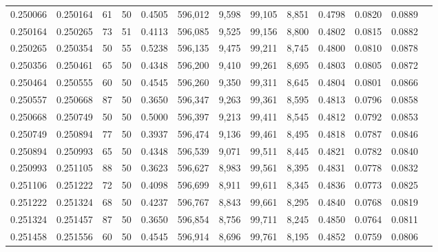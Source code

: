 \begin{tabular}{rrrrrrrrrrrrr}
0.250066 & 0.250164 &    61 &  50 &                                     0.4505 & 596,012 &   9,598 &  99,105 &   8,851 & 0.4798 & 0.0820 & 0.0889 \\
0.250164 & 0.250265 &    73 &  51 &                                     0.4113 & 596,085 &   9,525 &  99,156 &   8,800 & 0.4802 & 0.0815 & 0.0882 \\
0.250265 & 0.250354 &    50 &  55 &                                     0.5238 & 596,135 &   9,475 &  99,211 &   8,745 & 0.4800 & 0.0810 & 0.0878 \\
0.250356 & 0.250461 &    65 &  50 &                                     0.4348 & 596,200 &   9,410 &  99,261 &   8,695 & 0.4803 & 0.0805 & 0.0872 \\
0.250464 & 0.250555 &    60 &  50 &                                     0.4545 & 596,260 &   9,350 &  99,311 &   8,645 & 0.4804 & 0.0801 & 0.0866 \\
0.250557 & 0.250668 &    87 &  50 &                                     0.3650 & 596,347 &   9,263 &  99,361 &   8,595 & 0.4813 & 0.0796 & 0.0858 \\
0.250668 & 0.250749 &    50 &  50 &                                     0.5000 & 596,397 &   9,213 &  99,411 &   8,545 & 0.4812 & 0.0792 & 0.0853 \\
0.250749 & 0.250894 &    77 &  50 &                                     0.3937 & 596,474 &   9,136 &  99,461 &   8,495 & 0.4818 & 0.0787 & 0.0846 \\
0.250894 & 0.250993 &    65 &  50 &                                     0.4348 & 596,539 &   9,071 &  99,511 &   8,445 & 0.4821 & 0.0782 & 0.0840 \\
0.250993 & 0.251105 &    88 &  50 &                                     0.3623 & 596,627 &   8,983 &  99,561 &   8,395 & 0.4831 & 0.0778 & 0.0832 \\
0.251106 & 0.251222 &    72 &  50 &                                     0.4098 & 596,699 &   8,911 &  99,611 &   8,345 & 0.4836 & 0.0773 & 0.0825 \\
0.251222 & 0.251324 &    68 &  50 &                                     0.4237 & 596,767 &   8,843 &  99,661 &   8,295 & 0.4840 & 0.0768 & 0.0819 \\
0.251324 & 0.251457 &    87 &  50 &                                     0.3650 & 596,854 &   8,756 &  99,711 &   8,245 & 0.4850 & 0.0764 & 0.0811 \\
0.251458 & 0.251556 &    60 &  50 &                                     0.4545 & 596,914 &   8,696 &  99,761 &   8,195 & 0.4852 & 0.0759 & 0.0806 \\

\end{tabular}
